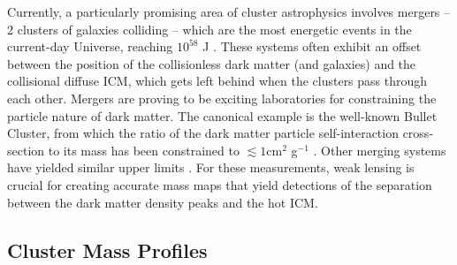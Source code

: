 


Currently, a particularly promising area of cluster astrophysics involves mergers -- 2 clusters of galaxies colliding -- which are the most energetic events in the current-day Universe, reaching $10^{58}$ J \citep{Markevitch07}. These systems often exhibit an offset between the position of the collisionless dark matter (and galaxies) and the collisional diffuse \ac{ICM}, which gets left behind when the clusters pass through each other. Mergers are proving to be exciting laboratories for constraining the particle nature of dark matter. The canonical example is the well-known Bullet Cluster, from which the ratio of the dark matter particle self-interaction cross-section to its mass has been constrained to $\lesssim 1 $cm$^2$ g$^{-1}$ \citep{Markevitch04}. Other merging systems have yielded similar upper limits \citep[see e.g.][]{Clowe12,Bradac08}. For these measurements, weak lensing is crucial for creating accurate mass maps that yield detections of the separation between the dark matter density peaks and the hot \ac{ICM}. %


\subsection{Cluster Mass Profiles}
\label{sec:Profiles}

